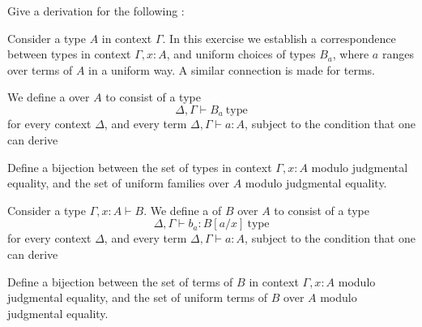\begin{exercises}
\item \label{ex:term_conversion}Give a derivation for the following :
\begin{prooftree}
\end{prooftree}
\item Consider a type $A$ in context $\Gamma$. In this exercise we establish a correspondence between types in context $\Gamma,x:A$, and uniform choices of types $B_a$, where $a$ ranges over terms of $A$ in a uniform way. A similar connection is made for terms.
  \begin{subexenum}
  \item We define a  over $A$ to consist of a type
    \begin{equation*}
      \Delta,\Gamma\vdash B_a~\mathrm{type}
    \end{equation*}
    for every context $\Delta$, and every term $\Delta,\Gamma\vdash a:A$, subject to the condition that one can derive
    \begin{prooftree}
    \end{prooftree}
    Define a bijection between the set of types in context $\Gamma,x:A$ modulo judgmental equality, and the set of uniform families over $A$ modulo judgmental equality. 
  \item Consider a type $\Gamma,x:A\vdash B$. We define a  of $B$ over $A$ to consist of a type
    \begin{equation*}
      \Delta,\Gamma\vdash b_a:B[a/x]~\mathrm{type}
    \end{equation*}
    for every context $\Delta$, and every term $\Delta,\Gamma\vdash a:A$, subject to the condition that one can derive
    \begin{prooftree}
    \end{prooftree}
    Define a bijection between the set of terms of $B$ in context $\Gamma,x:A$ modulo judgmental equality, and the set of uniform terms of $B$ over $A$ modulo judgmental equality. 
  \end{subexenum}
\end{exercises}
